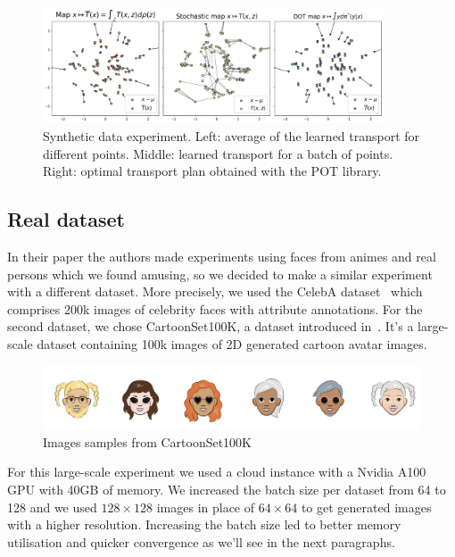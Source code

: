 \documentclass[11pt]{article}
\begin{document}
\begin{figure}[H]
    \centering
    \includegraphics[width=0.9\textwidth]{figures/toy_2.png}
    \caption{Synthetic data experiment. Left: average of the learned transport for different points. Middle: learned transport for a batch of points. Right: optimal transport plan obtained with the POT library.}
    \label{fig:toy_2}
\end{figure}

\subsection{Real dataset}

In their paper the authors made experiments using faces from animes and real persons which we found amusing, so we decided to make a similar experiment with a different dataset. More precisely, we used the CelebA dataset~\cite{celeba_dataset} which comprises 200k images of celebrity faces with attribute annotations. For the second dataset, we chose CartoonSet100K, a dataset introduced in~\cite{cartoonset_dataset}. It's a large-scale dataset containing 100k images of 2D generated cartoon avatar images.

\begin{figure}[h!]
    \centering
    \includegraphics[scale=.2]{figures/cartoonset-excerpt.png}
    \caption{Images samples from CartoonSet100K}
    \bigskip
\end{figure}

For this large-scale experiment we used a cloud instance with a Nvidia A100 GPU with 40GB of memory. We increased the batch size per dataset from 64 to 128 and we used $128\times128$ images in place of $64\times64$ to get generated images with a higher resolution. Increasing the batch size led to better memory utilisation and quicker convergence as we'll see in the next paragraphs.
\end{document}
